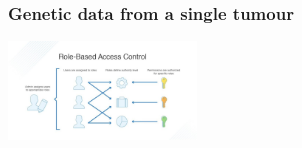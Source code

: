 \documentclass{beamer}
\begin{document}
\begin{frame}\frametitle{Genetic data from a single tumour}
    \includegraphics[width=5cm]{./img/rbac.jpg}
\end{frame}
\end{document}
